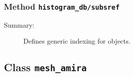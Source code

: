 \subsubsection[Method \texttt{subsref}]{Method \texttt{histogram\_db/subsref}}%
%
\label{ref_histogram_db__subsref}%
\hypertarget{ref_histogram_db__subsref}{}%
\begin{description}
\item[Summary:]Defines generic indexing for objects.
%
%
%
%
%
%
%
%
\end{description}
\methodline%
\subsection{Class \texttt{mesh\_amira}}%
%
\label{ref_mesh_amira}%
\hypertarget{ref_mesh_amira}{}%
